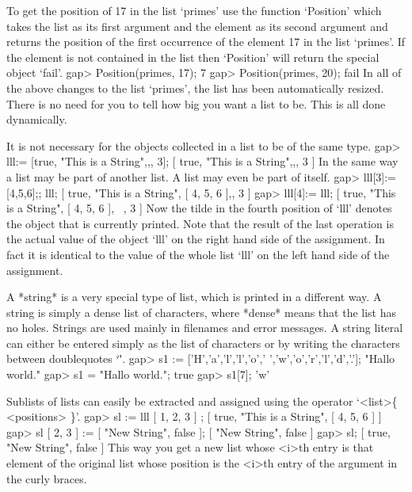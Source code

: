 To get the position    of 17 in  the   list  `primes' use   the  function
`Position' which takes the list as its  first argument and the element as
its second argument  and returns the position of  the first occurrence of
the element 17 in the list `primes'.
If the element is not contained in the list then `Position' will return
the special object `fail'.
\beginexample
gap> Position(primes, 17);
7
gap> Position(primes, 20);
fail
\endexample
In  all  of the  above changes to  the  list `primes',  the list has been
automatically resized.  There  is no need  for you to tell {\GAP} how big
you want a list to be.  This is all done dynamically.

It is not necessary for the objects collected in a list to be of the same
type.
\beginexample
gap> lll:= [true, "This is a String",,, 3];
[ true, "This is a String",,, 3 ] 
\endexample
In the same way a list may be part of another  list.  A list  may even be
part of itself.
\beginexample
gap> lll[3]:= [4,5,6];; lll;
[ true, "This is a String", [ 4, 5, 6 ],, 3 ]
gap> lll[4]:= lll;
[ true, "This is a String", [ 4, 5, 6 ], ~, 3 ] 
\endexample
Now the tilde in the fourth position of `lll'  denotes the object that is
currently  printed. Note that  the result  of the  last operation is  the
actual value  of  the  object  `lll'   on  the  right  hand side  of  the
assignment. In  fact it is  identical to the value  of the whole list
`lll' on the left hand side of the assignment.

%
A *string*  is a very  special   type of  list,  which  is  printed in  a
different way.  A string  is simply  a  dense list of   characters, where
*dense* means  that the list  has no holes.   Strings are used  mainly in
filenames and   error messages. A  string  literal can either  be entered
simply as the  list of characters  or  by writing the characters  between
doublequotes `\"'.
\beginexample
gap> s1 := ['H','a','l','l','o',' ','w','o','r','l','d','.'];
"Hallo world."
gap> s1 = "Hallo world.";
true
gap> s1[7];
'w' 
\endexample

%

Sublists of lists can easily be extracted and assigned using the operator
`<list>\{ <positions> \}'.
\beginexample
gap> sl := lll{ [ 1, 2, 3 ] };
[ true, "This is a String", [ 4, 5, 6 ] ]
gap> sl{ [ 2, 3 ] } := [ "New String", false ];
[ "New String", false ]
gap> sl;
[ true, "New String", false ] 
\endexample
This way you get a new list whose <i>th entry is that element of the
original list whose position is the <i>th entry of the argument in the
curly braces.

